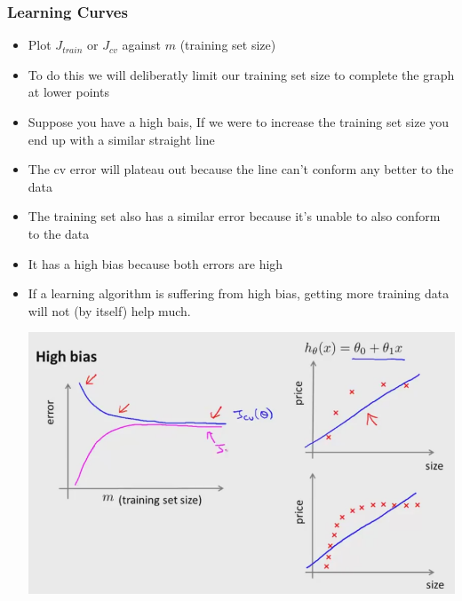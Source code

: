 \subsubsection{Learning Curves}
\begin{itemize}[--]
	\item Plot $J_{train}$ or $J_{cv}$ against $m$ (training set size)
	\item To do this we will deliberatly limit our training set size to complete the graph at lower points

	\item Suppose you have a high bais, If we were to increase the training set size you end up with a similar straight line
	\item The cv error will plateau out because the line can't conform any better to the data 
	\item The training set also has a similar error because it's unable to also conform to the data
	\item It has a high bias because both errors are high
	\item If a learning algorithm is suffering from high bias, getting more training data will not (by itself) help much.
	\begin{center}
		\includegraphics[scale=0.5]{sections/cs229/w7/bias.png}
	\end{center}


\end{itemize}
